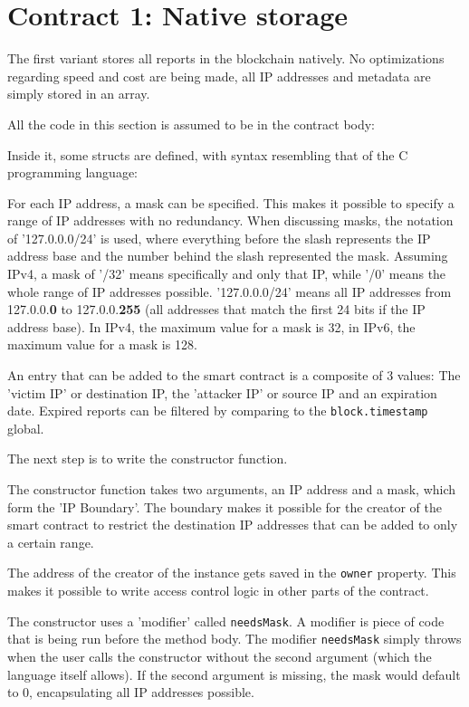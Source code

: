\section{Contract 1: Native storage}
The first variant stores all reports in the blockchain natively. No optimizations regarding speed and cost are being made, all IP addresses and metadata are simply stored in an array.

All the code in this section is assumed to be in the contract body:


Inside it, some structs are defined, with syntax resembling that of the C programming language:



For each IP address, a mask can be specified. This makes it possible to specify a range of IP addresses with no redundancy. 
When discussing masks, the notation of '127.0.0.0/24' is used, where everything before the slash represents the IP address base and the number behind the slash represented the mask. Assuming IPv4, a mask of '/32' means specifically and only that IP, while '/0' means the whole range of IP addresses possible. '127.0.0.0/24' means all IP addresses from 127.0.0.\textbf{0} to 127.0.0.\textbf{255} (all addresses that match the first 24 bits if the IP address base). In IPv4, the maximum value for a mask is 32, in IPv6, the maximum value for a mask is 128.

An entry that can be added to the smart contract is a composite of 3 values: The 'victim IP' or destination IP, the 'attacker IP' or source IP and an expiration date. Expired reports can be filtered by comparing to the \texttt{block.timestamp} global.

The next step is to write the constructor function.



The constructor function takes two arguments, an IP address and a mask, which form the 'IP Boundary'. The boundary makes it possible for the creator of the smart contract to restrict the destination IP addresses that can be added to only a certain range.

The address of the creator of the instance gets saved in the \texttt{owner} property. This makes it possible to write access control logic in other parts of the contract.

The constructor uses a 'modifier' called \texttt{needsMask}. A modifier is piece of code that is being run before the method body. The modifier \texttt{needsMask} simply throws when the user calls the constructor without the second argument (which the language itself allows). If the second argument is missing, the mask would default to 0, encapsulating all IP addresses possible.


